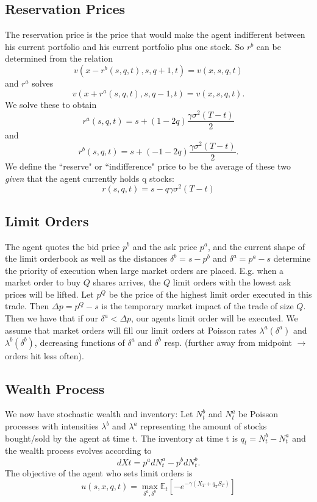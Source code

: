 \documentclass{article}
\begin{document}
\subsection{Reservation Prices}
The reservation price is the price that would make the agent indifferent between his current portfolio and his current portfolio plus one stock. So $r^b$ can be determined from the relation
$$v(x-r^b(s,q,t),s,q+1,t)=v(x,s,q,t)$$
and $r^a$ solves
$$v(x+r^a(s,q,t),s,q-1,t)=v(x,s,q,t).$$
We solve these to obtain
$$r^a(s,q,t)=s+(1-2q)\frac{\gamma\sigma^2(T-t)}{2}$$
and
$$r^b(s,q,t)=s+(-1-2q)\frac{\gamma\sigma^2(T-t)}{2}.$$
We define the ``reserve" or ``indifference" price to be the average of these two \textit{given} that the agent currently holds q stocks:
$$r(s,q,t)=s-q\gamma\sigma^2(T-t)$$
\subsection{Limit Orders}
The agent quotes the bid price $p^b$ and the ask price $p^a$, and the current shape of the limit orderbook as well as the distances $\delta^b=s-p^b$ and $\delta^a=p^a-s$ determine the priority of execution when large market orders are placed. E.g. when a market order to buy $Q$ shares arrives, the $Q$ limit orders with the lowest ask prices will be lifted. Let $p^Q$ be the price of the highest limit order executed in this trade. Then $\Delta p=p^Q-s$ is the temporary market impact of the trade of size $Q.$ Then we have that if our $\delta^a < \Delta p$, our agents limit order will be executed. We assume that market orders will fill our limit orders at Poisson rates $\lambda^a(\delta^a)$ and $\lambda^b(\delta^b)$, decreasing functions of $\delta^a$ and $\delta^b$ resp. (further away from midpoint $\rightarrow$ orders hit less often).
\subsection{Wealth Process}
We now have stochastic wealth and inventory: Let $N^b_t$ and $N^a_t$ be Poisson processes with intensities $\lambda^b$ and $\lambda^a$ representing the amount of stocks bought/sold by the agent at time t. The inventory at time t is $q_t=N^b_t-N^a_t$ and the wealth process evolves according to
$$dXt=p^adN^a_t-p^bdN^b_t.$$
The objective of the agent who sets limit orders is 
$$u(s,x,q,t)=\max\limits_{\delta^a,\delta^b}\mathbb{E}_t\left[-e^{-\gamma(X_T+q_TS_T)}\right]$$
\end{document}
